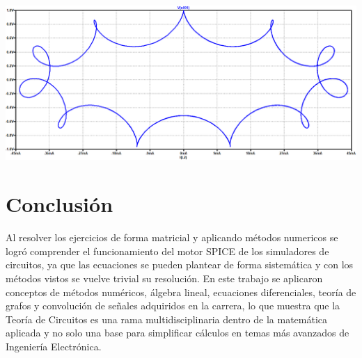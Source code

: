\documentclass[10pt,a4paper]{article} %
\begin{document}
\begin{center}
		\includegraphics[scale=0.4]{simulacion105}
	
\end{center}


\newpage

	\section{Conclusión}
	
	
	
	Al resolver los ejercicios de forma matricial y aplicando métodos numericos se logró comprender el funcionamiento del motor SPICE de los simuladores de circuitos, ya que las ecuaciones se pueden plantear de forma sistemática y con los métodos vistos se vuelve trivial su resolución. En este trabajo se aplicaron conceptos de métodos numéricos, álgebra lineal, ecuaciones diferenciales, teoría de grafos y convolución de señales adquiridos en la carrera, lo que muestra que la Teoría de Circuitos es una rama multidisciplinaria dentro de la matemática aplicada y no solo una base para simplificar cálculos en temas más avanzados de Ingeniería Electrónica.
	
\end{document}
